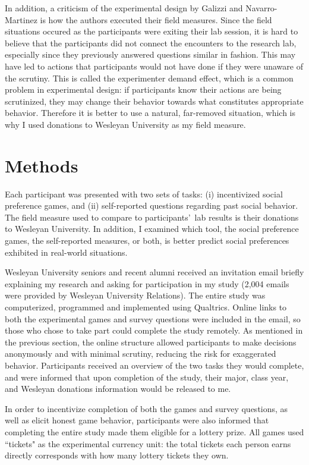 \documentclass[12pt]{article}
\begin{document}
In addition, a criticism of the experimental design by Galizzi and Navarro-Martinez is how the authors executed their field measures. Since the field situations occured as the participants were exiting their lab session, it is hard to believe that the participants did not connect the encounters to the research lab, especially since they previously answered questions similar in fashion. This may have led to actions that participants would not have done if they were unaware of the scrutiny. This is called the experimenter demand effect, which is a common problem in experimental design: if participants know their actions are being scrutinized, they may change their behavior towards what constitutes appropriate behavior. Therefore it is better to use a natural, far-removed situation, which is why I used donations to Wesleyan University as my field measure.

\section{Methods}

Each participant was presented with two sets of tasks: (i) incentivized social preference games, and (ii) self-reported questions regarding past social behavior. The field measure used to compare to participants\rq \ lab results is their donations to Wesleyan University.  In addition, I examined which tool, the social preference games, the self-reported measures, or both, is better predict social preferences exhibited in real-world situations.
 
Wesleyan University seniors and recent alumni received an invitation email briefly explaining my research and asking for participation in my study (2,004 emails were provided by Wesleyan University Relations). The entire study was computerized, programmed and implemented using Qualtrics. Online links to both the experimental games and survey questions were included in the email, so those who chose to take part could complete the study remotely. As mentioned in the previous section, the online structure allowed participants to make decisions anonymously and with minimal scrutiny, reducing the risk for exaggerated behavior. Participants received an overview of the two tasks they would complete, and were informed that upon completion of the study, their major, class year, and Wesleyan donations information would be released to me.

In order to incentivize completion of both the games and survey questions, as well as elicit honest game behavior, participants were also informed that completing the entire study made them eligible for a lottery prize. All games used ``tickets" as the experimental currency unit: the total tickets each person earns directly corresponds with how many lottery tickets they own.
\end{document}
